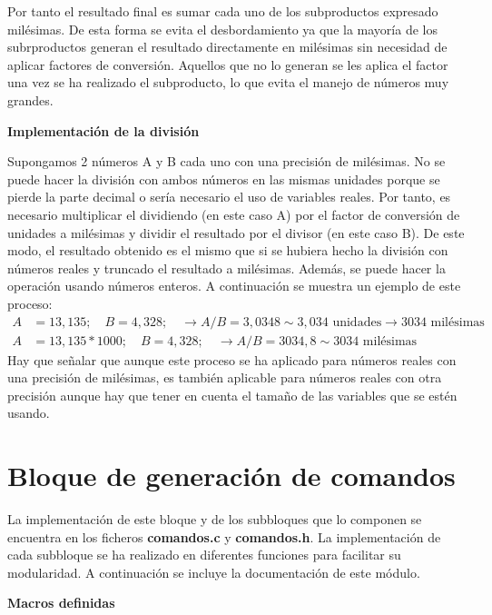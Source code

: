 	Por tanto el resultado final es sumar cada uno de los subproductos expresado milésimas. De esta forma se evita el desbordamiento ya que la mayoría de los subrproductos generan el resultado directamente en milésimas sin necesidad de aplicar factores de conversión. Aquellos que no lo generan se les aplica el factor una vez se ha realizado el subproducto, lo que evita el manejo de números muy grandes. 

\noindent\textbf{Implementación de la división}

	Supongamos 2 números A y B cada uno con una precisión de milésimas. No se puede hacer la división con ambos números en las mismas unidades porque se pierde la parte decimal o sería necesario el uso de variables reales. Por tanto, es necesario multiplicar el dividiendo (en este caso A) por el factor de conversión de unidades a milésimas y dividir el resultado por el divisor (en este caso B). De este modo, el resultado obtenido es el mismo que si se hubiera hecho la división con números reales y truncado el resultado a milésimas. Además, se puede hacer la operación usando números enteros. A continuación se muestra un ejemplo de este proceso: 
\begin{equation*}
	\begin{aligned}
		A &= 13,135; \quad B = 4,328; \quad\rightarrow A/B = 3,0348 \sim 3,034 \text{ unidades} \rightarrow  3034 \text{ milésimas} \\
       		A &= 13,135 \ast 1000 ; \quad B = 4,328;    \quad\rightarrow A/B = 3034,8 \sim 3034 \text{ milésimas} 
	\end{aligned}
\end{equation*}
Hay que señalar que aunque este proceso se ha aplicado para números reales con una precisión de milésimas, es también aplicable para números reales con otra precisión aunque hay que tener en cuenta el tamaño de las variables que se estén usando.

\section{Bloque de generación de comandos}\label{sec:comandos}

	La implementación de este bloque y de los subbloques que lo componen se encuentra en los ficheros \textbf{comandos.c} y \textbf{comandos.h}. La implementación de cada subbloque se ha realizado en diferentes funciones para facilitar su modularidad. A continuación se incluye la documentación de este módulo.

\noindent\Large\textbf{Macros definidas}\label{comandos:macros}

